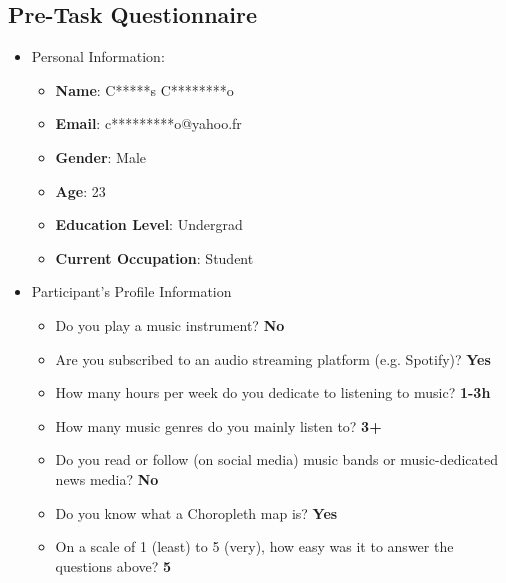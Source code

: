 \documentclass[twocolumn, letterpaper,13pt]{scrartcl}
\begin{document}
    \subsection*{Pre-Task Questionnaire}
    \begin{itemize}
        \item Personal Information: 
        \begin{itemize}
            \item \textbf{Name}: C*****s C********o
            \item \textbf{Email}: c*********o@yahoo.fr
            \item \textbf{Gender}: Male
            \item \textbf{Age}: 23
            \item \textbf{Education Level}: Undergrad
            \item \textbf{Current Occupation}: Student 
        \end{itemize}
        \item Participant's Profile Information
        \begin{itemize}
            \item Do you play a music instrument? \textbf{No}
            \item Are you subscribed to an audio streaming platform (e.g. Spotify)? \textbf{Yes}
            \item How many hours per week do you dedicate to listening to music? \textbf{1-3h}
            \item How many music genres do you mainly listen to? \textbf{3+}
            \item Do you read or follow (on social media) music bands or music-dedicated news media? \textbf{No}
            \item Do you know what a Choropleth map is? \textbf{Yes}
            \item On a scale of 1 (least) to 5 (very), how easy was it to answer the questions above? \textbf{5}
        \end{itemize}
    \end{itemize}
    
\end{document}
